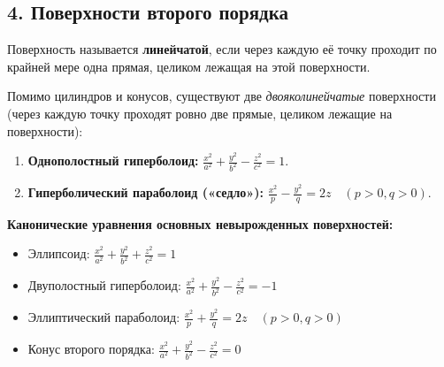 \subsection*{4. Поверхности второго порядка}

\begin{definition}
Поверхность называется \textbf{линейчатой}, если через каждую её точку проходит по крайней мере одна прямая, целиком лежащая на этой поверхности.
\end{definition}

Помимо цилиндров и конусов, существуют две \textit{двояколинейчатые} поверхности (через каждую точку проходят ровно две прямые, целиком лежащие на поверхности):
\begin{enumerate}
    \item \textbf{Однополостный гиперболоид:} $\frac{x^2}{a^2} + \frac{y^2}{b^2} - \frac{z^2}{c^2} = 1$.
    \item \textbf{Гиперболический параболоид («седло»):} $\frac{x^2}{p} - \frac{y^2}{q} = 2z \quad (p>0, q>0)$.
\end{enumerate}

\noindent\textbf{Канонические уравнения основных невырожденных поверхностей:}
\begin{itemize}
    \item Эллипсоид: $\frac{x^2}{a^2} + \frac{y^2}{b^2} + \frac{z^2}{c^2} = 1$
    \item Двуполостный гиперболоид: $\frac{x^2}{a^2} + \frac{y^2}{b^2} - \frac{z^2}{c^2} = -1$
    \item Эллиптический параболоид: $\frac{x^2}{p} + \frac{y^2}{q} = 2z \quad (p>0, q>0)$
    \item Конус второго порядка: $\frac{x^2}{a^2} + \frac{y^2}{b^2} - \frac{z^2}{c^2} = 0$
\end{itemize}
